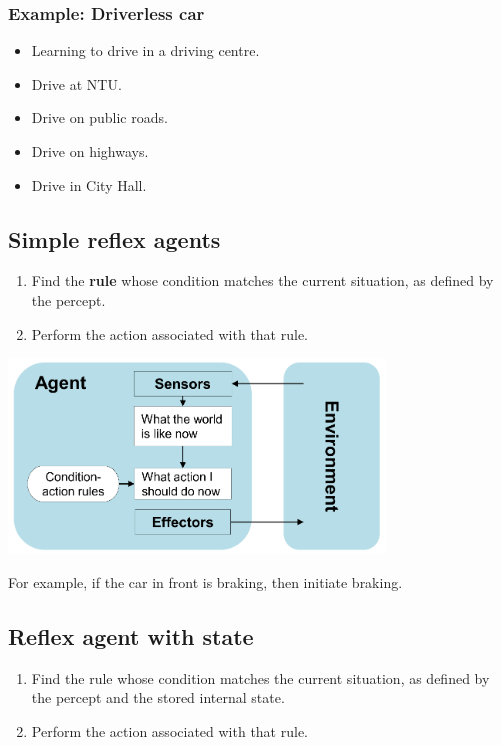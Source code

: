 \documentclass[11pt]{article}
\begin{document}
\subsubsection{Example: Driverless car}
\label{sec:org8067171}
\begin{itemize}
\item Learning to drive in a driving centre.
\item Drive at NTU.
\item Drive on public roads.
\item Drive on highways.
\item Drive in City Hall.
\end{itemize}

 \newpage
\subsection{Simple reflex agents}
\label{sec:org521af11}
\begin{enumerate}
\item Find the \textbf{rule} whose condition matches the current situation, as defined by the percept.
\item Perform the action associated with that rule.
\end{enumerate}

\begin{center}
\includegraphics[height=14em]{./images/simple-reflex-agent-example.png}
\end{center}

For example, if the car in front is braking, then initiate braking.
\subsection{Reflex agent with state}
\label{sec:org149f81e}
\begin{enumerate}
\item Find the rule whose condition matches the current situation, as defined by the percept and the stored internal state.
\item Perform the action associated with that rule.
\end{enumerate}
\end{document}
